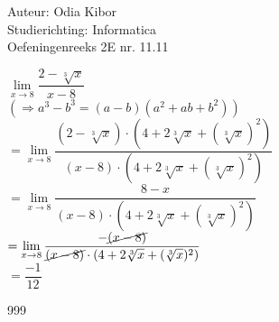 \documentclass[a4paper]{article}
\begin{document}
  
\noindent \large Auteur: Odia Kibor \\
\noindent \large Studierichting: Informatica\\
\noindent \large Oefeningenreeks 2E nr. 11.11\\

\medskip

\normalsize


$\lim\limits_{x \rightarrow 8} \dfrac{2 - \sqrt[3]{x}}{x-8}$\\

$(\Rightarrow a^3 - b^3 = (a-b)(a^2 + ab + b^2))$\\

$= \lim\limits_{x \rightarrow 8} \dfrac{(2 - \sqrt[3]{x})\cdot(4 + 2\sqrt[3]{x} + (\sqrt[3]{x})^2)}{(x-8)\cdot(4 + 2\sqrt[3]{x} + (\sqrt[3]{x})^2)}$\\

$= \lim\limits_{x \rightarrow 8} \dfrac{8-x}{(x-8)\cdot(4 + 2\sqrt[3]{x} + (\sqrt[3]{x})^2)}$\\

$= \lim\limits_{x \rightarrow 8} \dfrac{-\cancel{(x-8)}}{\cancel{(x-8)}\cdot(4 + 2\sqrt[3]{x} + (\sqrt[3]{x})^2)}$\\

$= \dfrac{-1}{12}$












\begin{thebibliography}{999}
\end{thebibliography}
\end{document}
